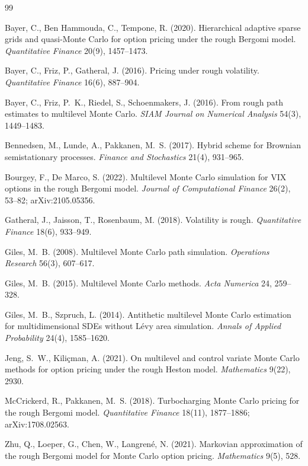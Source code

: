 \documentclass[11pt]{article}
\begin{document}
\begin{thebibliography}{99}

 Bayer, C., Ben Hammouda, C., Tempone, R. (2020). Hierarchical adaptive
sparse grids and quasi-Monte Carlo for option pricing under the rough Bergomi model.
\textit{Quantitative Finance} 20(9), 1457--1473.

 Bayer, C., Friz, P., Gatheral, J. (2016). Pricing under rough volatility.
\textit{Quantitative Finance} 16(6), 887--904.

 Bayer, C., Friz, P.~K., Riedel, S., Schoenmakers, J. (2016). From rough
path estimates to multilevel Monte Carlo. \textit{SIAM Journal on Numerical Analysis} 54(3),
1449--1483.

 Bennedsen, M., Lunde, A., Pakkanen, M.~S. (2017). Hybrid scheme for
Brownian semistationary processes. \textit{Finance and Stochastics} 21(4), 931--965.

 Bourgey, F., De Marco, S. (2022). Multilevel Monte Carlo simulation for
VIX options in the rough Bergomi model. \textit{Journal of Computational Finance} 26(2),
53--82; arXiv:2105.05356.

 Gatheral, J., Jaisson, T., Rosenbaum, M. (2018). Volatility is rough.
\textit{Quantitative Finance} 18(6), 933--949.

 Giles, M.~B. (2008). Multilevel Monte Carlo path simulation.
\textit{Operations Research} 56(3), 607--617.

 Giles, M.~B. (2015). Multilevel Monte Carlo methods.
\textit{Acta Numerica} 24, 259--328.

 Giles, M.~B., Szpruch, L. (2014). Antithetic multilevel Monte
Carlo estimation for multidimensional SDEs without L\'evy area simulation. \textit{Annals of
Applied Probability} 24(4), 1585--1620.

 Jeng, S.~W., Kili\c{c}man, A. (2021). On multilevel and control variate
Monte Carlo methods for option pricing under the rough Heston model. \textit{Mathematics}
9(22), 2930.

 McCrickerd, R., Pakkanen, M.~S. (2018). Turbocharging Monte Carlo
pricing for the rough Bergomi model. \textit{Quantitative Finance} 18(11), 1877--1886;
arXiv:1708.02563.

 Zhu, Q., Loeper, G., Chen, W., Langren\'e, N. (2021). Markovian
approximation of the rough Bergomi model for Monte Carlo option pricing. \textit{Mathematics}
9(5), 528.

\end{thebibliography}
\end{document}
